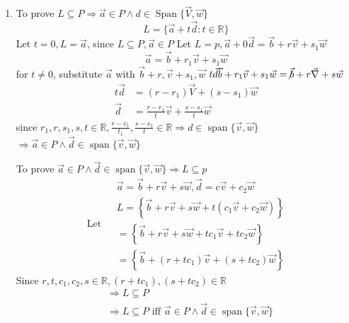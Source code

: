 \documentclass[11pt]{article}
\begin{document}
\begin{enumerate}[{\bf Q1.}]
	
	\newpage
	
	\item 
	\begin{enumerate}
		To prove $L \subseteq P \Rightarrow \vec{a} \in P \wedge d \in \operatorname{Span}\{\vec{V}, \vec{w}\}$
		$$
		L=\{\vec{a}+t \vec{d}: t \in \mathbb{R}\}
		$$
		Let $t=0, L=\vec{a}$, since $L \subseteq P, \vec{a} \in P$
		Let $L=p, \vec{a}+0 \vec{d}=\vec{b}+r \vec{v}+s_1 \vec{w}$
		$$
		\vec{a}=\vec{b}+r_1 \vec{v}+s_1 \vec{w}
		$$
		for $t \neq 0$, substitute $\vec{a}$ with $\vec{b}+r, \vec{v}+s_1, \vec{w}$
		$t \vec{d} \vec{b}+r_1 \vec{v}+s_1 \vec{w}=\not \vec{b}+r \vec{\nabla}+s \vec{w}$
		$$
		\begin{aligned}
		t \vec{d} & =\left(r-r_1\right) \vec{V}+\left(s-s_1\right) \vec{w} \\
		\vec{d} & =\frac{r-r_1}{t} \vec{v}+\frac{s-s_1}{t} \vec{w}
		\end{aligned}
		$$
		since $r_1, r, s_1, s, t \in \mathbb{R}, \frac{r-v_1}{t_1}, \frac{s-s_1}{t} \in \mathbb{R} \Rightarrow d \in \operatorname{span}\{\vec{v}, \vec{w}\}$ $\Rightarrow \vec{a} \in P \wedge \vec{d} \in \operatorname{span}\{\vec{v}, \vec{w}\}$
		
		To prove $\vec{a} \in P \wedge \vec{d} \in \operatorname{span}\{\vec{v}, \vec{w}\} \Rightarrow L \subseteq p$
		$$
		\text { Let } \begin{aligned}
		& \vec{a}=\vec{b}+r \vec{v}+s \vec{w}, \vec{d}=c \vec{v}+c_2 \vec{w} \\
		& L=\left\{\vec{b}+r \vec{v}+s \vec{w}+t\left(c_1 \vec{v}+c_2 \vec{w}\right)\right\} \\
		&=\left\{\vec{b}+r \vec{v}+s \vec{w}+t c_1 \vec{v}+t c_2 \vec{w}\right\} \\
		&=\left\{\vec{b}+\left(r+t c_1\right) \vec{v}+\left(s+t c_2\right) \vec{w}\right\}
		\end{aligned}
		$$
		Since $r, t, c_1, c_2, s \in \mathbb{R},\left(r+t c_1\right),\left(s+t c_2\right) \in \mathbb{R}$
		$$
		\begin{aligned}
		& \Rightarrow L \subseteq P \\
		& \Rightarrow L \subseteq P \text { iff } \vec{a} \in P \wedge \vec{d} \in \operatorname{span}\{\vec{v}, \vec{w}\}
		\end{aligned}
		$$
	\end{enumerate}

\end{enumerate}
\end{document}

